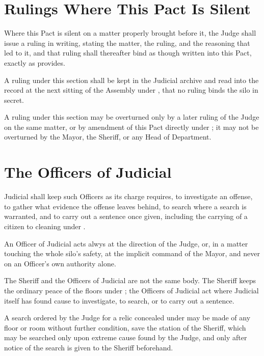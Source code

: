 \section{Rulings Where This Pact Is Silent}
\label{sec:judicial:rulings-where-this-pact-is-silent}

Where this Pact is silent on a matter properly brought before it, the Judge shall issue a ruling in writing, stating the matter, the ruling, and the reasoning that led to it, and that ruling shall thereafter bind as though written into this Pact, exactly as  provides.

\begin{clauses}
\item A ruling under this section shall be kept in the Judicial archive and read into the record at the next sitting of the Assembly under , that no ruling binds the silo in secret.
\item A ruling under this section may be overturned only by a later ruling of the Judge on the same matter, or by amendment of this Pact directly under ; it may not be overturned by the Mayor, the Sheriff, or any Head of Department.
\end{clauses}

\section{The Officers of Judicial}
\label{sec:judicial:officers-of-judicial}

Judicial shall keep such Officers as its charge requires, to investigate an offense, to gather what evidence the offense leaves behind, to search where a search is warranted, and to carry out a sentence once given, including the carrying of a citizen to cleaning under .

\begin{clauses}
\item An Officer of Judicial acts alwys at the direction of the Judge, or, in a matter touching the whole silo's safety, at the implicit command of the Mayor, and never on an Officer's own authority alone.
\item The Sheriff and the Officers of Judicial are not the same body. The Sheriff keeps the ordinary peace of the floors under ; the Officers of Judicial act where Judicial itself has found cause to investigate, to search, or to carry out a sentence.
\item A search ordered by the Judge for a relic concealed under  may be made of any floor or room without further condition, save the station of the Sheriff, which may be searched only upon extreme cause found by the Judge, and only after notice of the search is given to the Sheriff beforehand.
\end{clauses}

